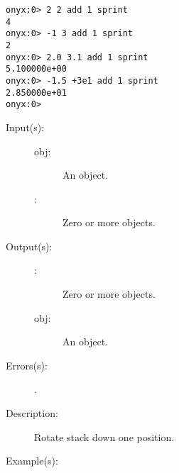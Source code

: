 \begin{description}
\begin{description}
\begin{verbatim}
onyx:0> 2 2 add 1 sprint
4
onyx:0> -1 3 add 1 sprint
2
onyx:0> 2.0 3.1 add 1 sprint
5.100000e+00
onyx:0> -1.5 +3e1 add 1 sprint
2.850000e+01
onyx:0>
		\end{verbatim}
	\end{description}
\label{systemdict:adn}
\item[{\onyxop{obj \commas}{adn}{\commas obj}}: ]
	\begin{description}\item[]
	\item[Input(s): ]
		\begin{description}\item[]
		\item[obj: ]
			An object.
		\item[\commas: ]
			Zero or more objects.
		\end{description}
	\item[Output(s): ]
		\begin{description}\item[]
		\item[\commas: ]
			Zero or more objects.
		\item[obj: ]
			An object.
		\end{description}
	\item[Errors(s): ]
		\begin{description}\item[]
		\item[.]
		\end{description}
	\item[Description: ]
		Rotate stack down one position.
	\item[Example(s): ]\begin{verbatim}


\end{verbatim}
\end{description}
\end{description}
